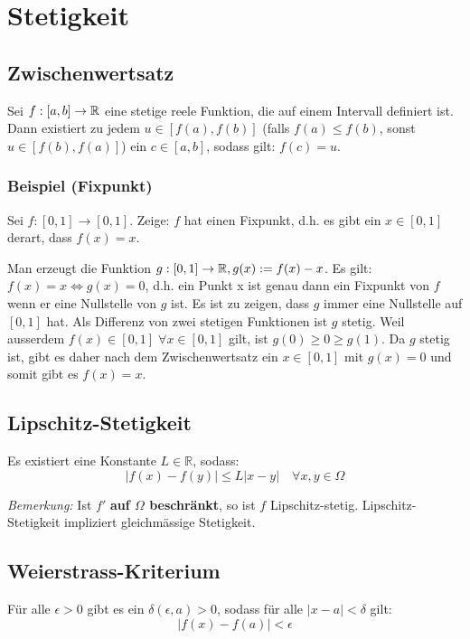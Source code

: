 
\newpage
\section{Stetigkeit}

\subsection{Zwischenwertsatz}
Sei $f: [a,b] \to \mathbb{R}$ eine stetige reele Funktion, die auf einem Intervall
definiert ist. Dann existiert zu jedem $u \in [f(a), f(b)]$ (falls $f(a) \leq
f(b)$, sonst $u \in [f(b), f(a)]$) ein $c \in [a,b]$, sodass gilt: $f(c)= u$.

\subsubsection{Beispiel (Fixpunkt)}
Sei $f: [0,1] \to [0,1]$. Zeige: $f$ hat einen Fixpunkt, d.h. es gibt ein $x
\in [0,1]$ derart, dass $f(x) = x$.

Man erzeugt die Funktion $g: [0,1] \to \mathbb{R}, g(x) := f(x) - x$. Es gilt: $f(x) =
x \Leftrightarrow g(x) = 0$, d.h. ein Punkt x ist genau dann ein Fixpunkt von
$f$ wenn er eine Nullstelle von $g$ ist. Es ist zu zeigen, dass $g$ immer eine
Nullstelle auf $[0,1]$ hat. Als Differenz von zwei stetigen Funktionen ist $g$
stetig. Weil ausserdem $f(x) \in [0,1] \; \forall x \in [0,1]$ gilt, ist $g(0)
\geq 0 \geq g(1)$. Da $g$ stetig ist, gibt es daher nach dem Zwischenwertsatz
ein $x \in [0,1]$ mit $g(x) = 0$ und somit gibt es $f(x) = x$.


\subsection{Lipschitz-Stetigkeit}
Es existiert eine Konstante $L\in \mathbb{R}$, sodass:
\begin{equation*}
	|f(x)-f(y)|\leq L|x-y| \quad \forall x,y \in \Omega
\end{equation*}

\emph{Bemerkung:} Ist $f'$ \textbf{auf $\Omega$ beschr{\"a}nkt}, so ist $f$ Lipschitz-stetig. Lipschitz-Stetigkeit impliziert gleichm{\"a}ssige Stetigkeit.

\subsection{Weierstrass-Kriterium}
F{\"u}r alle $\epsilon > 0$ gibt es ein $\delta(\epsilon, a) >0$, sodass f{\"u}r alle $|x-a|<\delta$ gilt:
\begin{equation*}
	|f(x) -f(a)|<\epsilon
\end{equation*}

